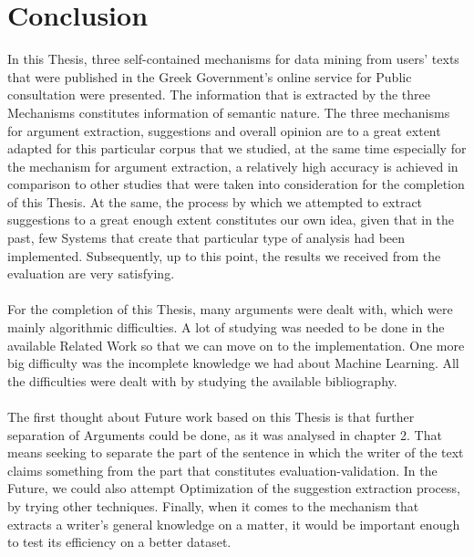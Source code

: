 \chapter{Conclusion}\label{ch_6}
In this Thesis, three self-contained mechanisms for data mining from users' texts that were published in the Greek Government's online service for Public consultation were presented. The information that is extracted by the three Mechanisms constitutes information of semantic nature. The three mechanisms for argument extraction, suggestions and overall opinion are to a great extent adapted for this particular corpus that we studied, at the same time especially for the mechanism for argument extraction, a relatively high accuracy is achieved in comparison to other studies that were taken into consideration for the completion of this Thesis. At the same, the process by which we attempted to extract suggestions to a great enough extent constitutes our own idea, given that in the past, few Systems that create that particular type of analysis had been implemented. Subsequently, up to this point, the results we received from the evaluation are very satisfying.\\
\\
For the completion of this Thesis, many arguments were dealt with, which were mainly algorithmic difficulties. A lot of studying was needed to be done in the available Related Work so that we can move on to the implementation. One more big difficulty was the incomplete knowledge we had about Machine Learning. All the difficulties were dealt with by studying the available bibliography.\\
\\
The first thought about Future work based on this Thesis is that further separation of Arguments could be done, as it was analysed in chapter 2. That means seeking to separate the part of the sentence in which the writer of the text claims something from the part that constitutes evaluation-validation. In the Future, we could also attempt Optimization of the suggestion extraction process, by trying other techniques. Finally, when it comes to the mechanism that extracts a writer's general knowledge on a matter, it would be important enough to test its efficiency on a better dataset.